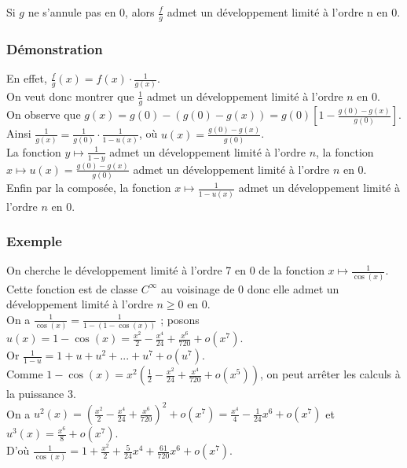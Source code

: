 \documentclass[a4paper,10pt]{book} %
\newcommand{\dl}{développement limité }
\begin{document}
Si $g$ ne s'annule pas en 0, alors $\frac{f}{g}$ admet un \dl à l'ordre n en 0.

\subsubsection{Démonstration}
En effet, $\frac{f}{g}(x)=f(x)\cdot \frac{1}{g(x)}$.\\

On veut donc montrer que $\frac{1}{g}$ admet un \dl à l'ordre $n$ en 0.\\

On observe que $g(x)=g(0)-(g(0)-g(x))=g(0)\left[1-\frac{g(0)-g(x)}{g(0)}\right]$.\\
Ainsi $\frac{1}{g(x)}=\frac{1}{g(0)}\cdot \frac{1}{1-u(x)}$, où $u(x)=\frac{g(0)-g(x)}{g(0)}$.\\

La fonction $y\mapsto \frac{1}{1-y}$ admet un \dl à l'ordre $n$, la fonction\\$x\mapsto u(x)=\frac{g(0)-g(x)}{g(0)}$ admet un \dl à l'ordre $n$ en 0.\\
Enfin par la composée, la fonction $x\mapsto \frac{1}{1-u(x)}$ admet un \dl à l'ordre $n$ en 0.

\subsubsection{Exemple}
On cherche le \dl à l'ordre 7 en 0 de la fonction $x\mapsto \frac{1}{\cos(x)}$.\\
Cette fonction est de classe $C^\infty$ au voisinage de 0 donc elle admet un \dl à l'ordre $n \geq 0$ en 0.\\

On a $\frac{1}{\cos(x)}=\frac{1}{1-(1-\cos(x))}$ ; posons $u(x)=1-\cos(x)=\frac{x^2}{2}-\frac{x^4}{24}+\frac{x^6}{720}+o(x^7)$.\\
Or $\frac{1}{1-u}=1+u+u^2+...+u^7+o(u^7)$.\\

Comme $1-\cos(x)=x^2(\frac{1}{2}-\frac{x^2}{24}+\frac{x^4}{720}+o(x^5))$, on peut arrêter les calculs à la puissance 3.\\
On a $u^2(x)=(\frac{x^2}{2}-\frac{x^4}{24}+\frac{x^6}{720})^2+o(x^7)=\frac{x^4}{4}-\frac{1}{24}x^6+o(x^7)$ et $u^3(x)=\frac{x^6}{8}+o(x^7)$.\\

D'où $\frac{1}{\cos(x)}=1+\frac{x^2}{2}+\frac{5}{24}x^4+\frac{61}{720}x^6+o(x^7)$.\\\\
\end{document}
